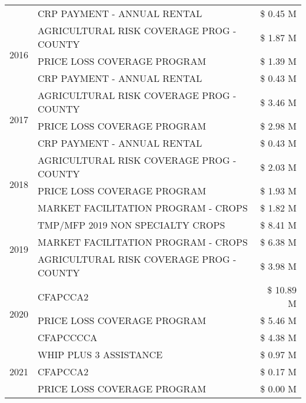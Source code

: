 \begin{tabular}{llr}
 & CRP PAYMENT - ANNUAL RENTAL & \$ 0.45 M \\
\cline{1-3}
\multirow[t]{3}{*}{2016} & AGRICULTURAL RISK COVERAGE PROG - COUNTY & \$ 1.87 M \\
 & PRICE LOSS COVERAGE PROGRAM & \$ 1.39 M \\
 & CRP PAYMENT - ANNUAL RENTAL & \$ 0.43 M \\
\cline{1-3}
\multirow[t]{3}{*}{2017} & AGRICULTURAL RISK COVERAGE PROG - COUNTY & \$ 3.46 M \\
 & PRICE LOSS COVERAGE PROGRAM & \$ 2.98 M \\
 & CRP PAYMENT - ANNUAL RENTAL & \$ 0.43 M \\
\cline{1-3}
\multirow[t]{3}{*}{2018} & AGRICULTURAL RISK COVERAGE PROG - COUNTY & \$ 2.03 M \\
 & PRICE LOSS COVERAGE PROGRAM & \$ 1.93 M \\
 & MARKET FACILITATION PROGRAM - CROPS & \$ 1.82 M \\
\cline{1-3}
\multirow[t]{3}{*}{2019} & TMP/MFP 2019 NON SPECIALTY CROPS & \$ 8.41 M \\
 & MARKET FACILITATION PROGRAM - CROPS & \$ 6.38 M \\
 & AGRICULTURAL RISK COVERAGE PROG - COUNTY & \$ 3.98 M \\
\cline{1-3}
\multirow[t]{3}{*}{2020} & CFAPCCA2 & \$ 10.89 M \\
 & PRICE LOSS COVERAGE PROGRAM & \$ 5.46 M \\
 & CFAPCCCCA & \$ 4.38 M \\
\cline{1-3}
\multirow[t]{3}{*}{2021} & WHIP PLUS 3 ASSISTANCE & \$ 0.97 M \\
 & CFAPCCA2 & \$ 0.17 M \\
 & PRICE LOSS COVERAGE PROGRAM & \$ 0.00 M \\
\cline{1-3}
\bottomrule
\end{tabular}
